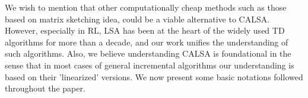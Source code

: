 We wish to mention that other computationally cheap methods such as those based on matrix sketching idea, could be a viable alternative to  CALSA. However, especially in RL, LSA has been at the heart of the widely used TD algorithms for more than a decade, and our work unifies the understanding of such algorithms. Also, we believe understanding CALSA is foundational in the sense that in most cases of general incremental algorithms our understanding is based on their 'linearized' versions. We now present some basic notations followed throughout the paper.
\begin{comment}
\footnote{Of course, the term $C_{P',\alpha}/t^2$ needs to be controlled, as well. Just like \citet{bach}, here we focus on $C_{P,\alpha}$, which is justified if one considers the MSE as $t\to\infty$. Further justification is that we actually find a negative result. See above.}
We show via an example that in general this is not possible.
In particular, the example applies to RL, hence, we get a negative result for RL, which states that from only bounds on the data one cannot choose a step-size $\alpha$ to guarantee that $C_{P,\alpha}$ of CS-PR is uniformly bounded over $\P$.
We also define a subclass  $\P_{\text{SPD},B}$ of problems, related to SGD for LSE, that does `admit' a uniform constant step-size, thereby recovering a part of the result by \citet{bach}.
Our results in particular shed light on the precise structural assumptions that are needed 
to achieve a uniform bound for CS-PR. 
For further details, see \Cref{sec:related}.
\item \textbf{Automatic Step-Size} (\Cref{sec:stepsizes}):
The above negative result implies that in RL one needs to choose the constant step-size based on properties of the instance $P$ to avoid the explosion of the MSE.
To circumvent this, we propose a natural step-size tuning method to guarantee instance-dependent boundedness.
We experimentally evaluate the proposed method and find that it is indeed able to achieve its goal on a set of synthetic examples
where no constant step-size is available to prevent exploding MSE. %

\end{comment}
